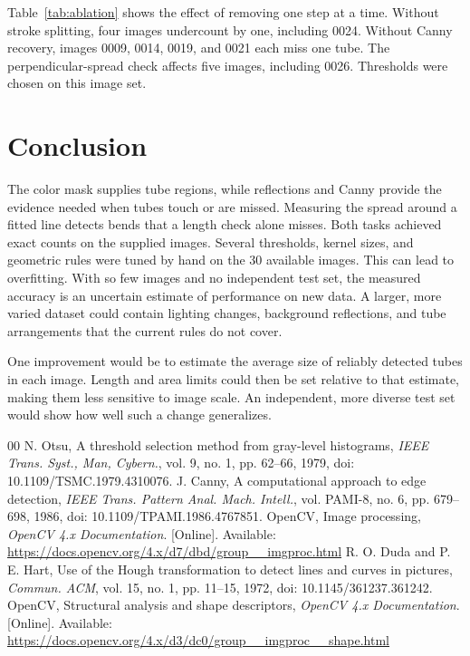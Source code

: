 \documentclass[conference]{IEEEtran}
\begin{document}
Table~\ref{tab:ablation} shows the effect of removing one step at a time. Without stroke splitting, four images undercount by one, including 0024. Without Canny recovery, images 0009, 0014, 0019, and 0021 each miss one tube. The perpendicular-spread check affects five images, including 0026. Thresholds were chosen on this image set.

\newpage
\section{Conclusion}
The color mask supplies tube regions, while reflections and Canny provide the evidence needed when tubes touch or are missed. Measuring the spread around a fitted line detects bends that a length check alone misses. Both tasks achieved exact counts on the supplied images. Several thresholds, kernel sizes, and geometric rules were tuned by hand on the 30 available images. This can lead to overfitting. With so few images and no independent test set, the measured accuracy is an uncertain estimate of performance on new data. A larger, more varied dataset could contain lighting changes, background reflections, and tube arrangements that the current rules do not cover.

One improvement would be to estimate the average size of reliably detected tubes in each image. Length and area limits could then be set relative to that estimate, making them less sensitive to image scale. An independent, more diverse test set would show how well such a change generalizes.



\begin{thebibliography}{00}
N. Otsu, A threshold selection method from gray-level histograms, \emph{IEEE Trans. Syst., Man, Cybern.}, vol. 9, no. 1, pp. 62--66, 1979, doi: 10.1109/TSMC.1979.4310076.
J. Canny, A computational approach to edge detection, \emph{IEEE Trans. Pattern Anal. Mach. Intell.}, vol. PAMI-8, no. 6, pp. 679--698, 1986, doi: 10.1109/TPAMI.1986.4767851.
OpenCV, Image processing, \emph{OpenCV 4.x Documentation}. [Online]. Available: \url{https://docs.opencv.org/4.x/d7/dbd/group__imgproc.html}
R. O. Duda and P. E. Hart, Use of the Hough transformation to detect lines and curves in pictures, \emph{Commun. ACM}, vol. 15, no. 1, pp. 11--15, 1972, doi: 10.1145/361237.361242.
OpenCV, Structural analysis and shape descriptors, \emph{OpenCV 4.x Documentation}. [Online]. Available: \url{https://docs.opencv.org/4.x/d3/dc0/group__imgproc__shape.html}
\end{thebibliography}
\end{document}
